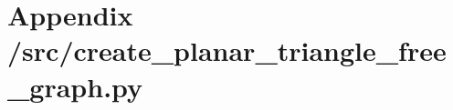\section{Appendix /src/create\_planar\_triangle\_free\_graph.py}\label{app:create_planar_triangle_free_graph.py}
